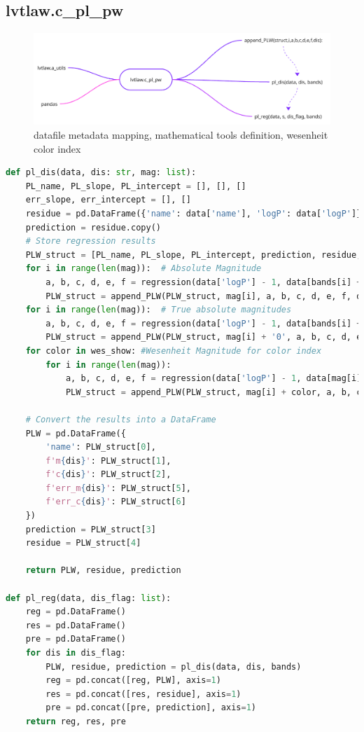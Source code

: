 \documentclass{article}
\begin{document}
\newpage
\subsection{lvtlaw.c\_pl\_pw}
\begin{figure}[h!]
\caption{\small datafile metadata mapping, mathematical tools definition, wesenheit color index}
\includegraphics[width=\textwidth]{./figures/c_pl_pw.png}
\end{figure}


\begin{lstlisting}[language=Python, caption=dependencies for main.py]
def pl_dis(data, dis: str, mag: list):
    PL_name, PL_slope, PL_intercept = [], [], []
    err_slope, err_intercept = [], []
    residue = pd.DataFrame({'name': data['name'], 'logP': data['logP']})
    prediction = residue.copy()   
    # Store regression results
    PLW_struct = [PL_name, PL_slope, PL_intercept, prediction, residue, err_slope, err_intercept]    
    for i in range(len(mag)):  # Absolute Magnitude
        a, b, c, d, e, f = regression(data['logP'] - 1, data[bands[i] + dis], '(logP - 1)', bands[i] + dis, 1)
        PLW_struct = append_PLW(PLW_struct, mag[i], a, b, c, d, e, f, dis)
    for i in range(len(mag)):  # True absolute magnitudes
        a, b, c, d, e, f = regression(data['logP'] - 1, data[bands[i] + '0' + dis], '(logP -1)', bands[i] + '0' + dis, 1)
        PLW_struct = append_PLW(PLW_struct, mag[i] + '0', a, b, c, d, e, f, dis)
    for color in wes_show: #Wesenheit Magnitude for color index
        for i in range(len(mag)):
            a, b, c, d, e, f = regression(data['logP'] - 1, data[mag[i] + color + dis], '(logP - 1)', mag[i] + color + dis, 1)
            PLW_struct = append_PLW(PLW_struct, mag[i] + color, a, b, c, d, e, f, dis)
    
    # Convert the results into a DataFrame
    PLW = pd.DataFrame({
        'name': PLW_struct[0],
        f'm{dis}': PLW_struct[1],
        f'c{dis}': PLW_struct[2],
        f'err_m{dis}': PLW_struct[5],
        f'err_c{dis}': PLW_struct[6]
    })
    prediction = PLW_struct[3]
    residue = PLW_struct[4]
    
    return PLW, residue, prediction

def pl_reg(data, dis_flag: list):
    reg = pd.DataFrame()
    res = pd.DataFrame()
    pre = pd.DataFrame()
    for dis in dis_flag:
        PLW, residue, prediction = pl_dis(data, dis, bands)
        reg = pd.concat([reg, PLW], axis=1)
        res = pd.concat([res, residue], axis=1)
        pre = pd.concat([pre, prediction], axis=1)
    return reg, res, pre

\end{lstlisting}
\end{document}
